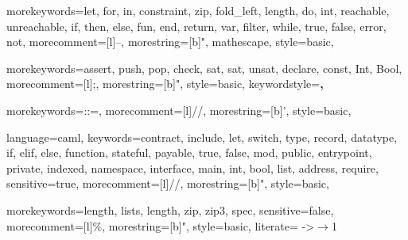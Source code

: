 


{
  morekeywords={let, for, in, constraint, zip, fold_left, length, do, int, reachable, unreachable,
    if, then, else, fun, end, return, var, filter, while, true, false, error, not},
  morecomment=[l]{--},
  morestring=[b]",
  mathescape,
  style=basic,
}

{
  morekeywords={assert, push, pop, check, sat, sat, unsat, declare, const, Int, Bool},
  morecomment=[l]{;},
  morestring=[b]",
  style=basic,
  keywordstyle=\bfseries\ttfamily,
}

{
  morekeywords={::=},
  morecomment=[l]{//},
  morestring=[b]',
  style=basic,
}

{
  language=caml,
  keywords={contract, include, let, switch, type, record, datatype, if, elif, else, function,
    stateful, payable, true, false, mod, public, entrypoint, private, indexed, namespace,
    interface, main, int, bool, list, address, require},
  sensitive=true,
  morecomment=[l]{//},
  morestring=[b]",
  style=basic,
}

{
  morekeywords={length, lists, length, zip, zip3, spec},
  sensitive=false,
  morecomment=[l]{\%},
  morestring=[b]",
  style=basic,
  literate=
  {->}{$\to{}$}{1}
}


\graphicspath{ {./images/} }

\newenvironment{code}[4][htp]
{\VerbatimEnvironment
  \begin{figure}[#1]
    \centering
    \ifthenelse{\equal{#3}{}}{}{\caption{#3}}
    \ifthenelse{\equal{#3}{}}{}{\label{#4}}
\begin{verbatim}}
    {\end{verbatim}\end{figure}}


\xapptocmd{\ttfamily}{\frenchspacing}{}{}
